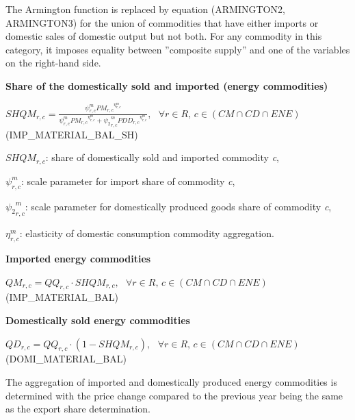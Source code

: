 \documentclass[10pt,a4paper,titlepage,dvipdfmx]{book}
\begin{document}
The Armington function is replaced by equation (ARMINGTON2, ARMINGTON3) for the union of commodities that have either imports or domestic sales of domestic output but not both. For any commodity in this category, it imposes equality between ''composite supply'' and one of the variables on the right-hand side.

\begin{flushleft}\textbf{Share of the domestically sold and imported (energy commodities)}\end{flushleft}


\begin{center}$SHQM_{r,c}=\frac{\psi _{r,c}^{m}P{M_{r,c}}^{\eta _{r,c}^{m}}}{\psi _{r,c}^{m}P{M_{r,c}}^{\eta _{r,c}^{m}}+{\psi _{2}}_{r,c}^{m}PD{D_{r,c}}^{\eta _{r,c}^{m}}},\,\,\,\,\forall r\in R,\,c\in \left(CM\cap CD\cap ENE\right)$ (IMP\_MATERIAL\_BAL\_SH)
\end{center}

\begin{flushleft}
$SHQM_{r,c}$: share of domestically sold and imported commodity \textit{c},

$\psi _{r,c}^{m}$: scale parameter for import share of commodity \textit{c}, 

${\psi _{2}}_{r,c}^{m}$: scale parameter for domestically produced goods share of commodity \textit{c},

$\eta _{r,c}^{m}$: elasticity of domestic consumption commodity aggregation.
\end{flushleft}

\begin{flushleft}\textbf{Imported energy commodities}\end{flushleft}


\begin{center}$QM_{r,c}=QQ_{r,c}\cdot SHQM_{r,c},\,\,\,\,\forall r\in R,\,c\in \left(CM\cap CD\cap ENE\right)$ (IMP\_MATERIAL\_BAL)
\end{center}

\begin{flushleft}\textbf{Domestically sold energy commodities}\end{flushleft}


\begin{center}$QD_{r,c}=QQ_{r,c}\cdot \left(1-SHQM_{r,c}\right),\,\,\,\,\forall r\in R,\,c\in \left(CM\cap CD\cap ENE\right)$ (DOMI\_MATERIAL\_BAL)
\end{center}

The aggregation of imported and domestically produced energy commodities is determined with the price change compared to the previous year being the same as the export share determination. 
\end{document}
